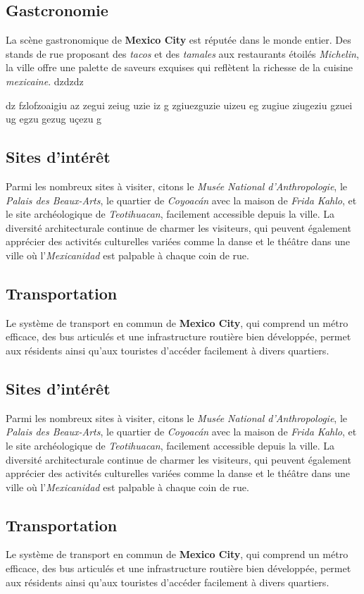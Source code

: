 \documentclass[12pt, a4paper]{article}
\begin{document}
\subsection*{\textbf{Gastcronomie}}

La scène gastronomique de \textbf{Mexico City} est réputée dans le monde entier. Des stands de rue proposant des \textit{tacos} et des \textit{tamales} aux restaurants étoilés \textit{Michelin}, la ville offre une palette de saveurs exquises qui reflètent la richesse de la cuisine \textit{mexicaine}.
dzdzdz

dz
fzlofzoaigiu 
az
zegui zeiug uzie iz
g
zgiuezguzie uizeu
 eg
zugiue ziugeziu gzuei 
ug 
 egzu gezug uçezu
g
\subsection*{\textbf{Sites d'intérêt}}

Parmi les nombreux sites à visiter, citons le \textit{Musée National d'Anthropologie}, le \textit{Palais des Beaux-Arts}, le quartier de \textit{Coyoacán} avec la maison de \textit{Frida Kahlo}, et le site archéologique de \textit{Teotihuacan}, facilement accessible depuis la ville.
La diversité architecturale continue de charmer les visiteurs, qui peuvent également apprécier des activités culturelles variées comme la danse et le théâtre dans une ville où l'\textit{Mexicanidad} est palpable à chaque coin de rue. \subsection*{\textbf{Transportation}} Le système de transport en commun de \textbf{Mexico City}, qui comprend un métro efficace, des bus articulés et une infrastructure routière bien développée, permet aux résidents ainsi qu'aux touristes d'accéder facilement à divers quartiers.

\subsection*{\textbf{Sites d'intérêt}}

Parmi les nombreux sites à visiter, citons le \textit{Musée National d'Anthropologie}, le \textit{Palais des Beaux-Arts}, le quartier de \textit{Coyoacán} avec la maison de \textit{Frida Kahlo}, et le site archéologique de \textit{Teotihuacan}, facilement accessible depuis la ville.
La diversité architecturale continue de charmer les visiteurs, qui peuvent également apprécier des activités culturelles variées comme la danse et le théâtre dans une ville où l'\textit{Mexicanidad} est palpable à chaque coin de rue. \subsection*{\textbf{Transportation}} Le système de transport en commun de \textbf{Mexico City}, qui comprend un métro efficace, des bus articulés et une infrastructure routière bien développée, permet aux résidents ainsi qu'aux touristes d'accéder facilement à divers quartiers.
\end{document}

